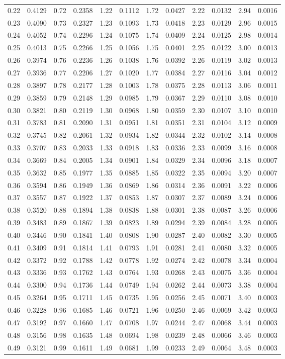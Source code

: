 \documentclass[11pt,a4paper,openany]{book}
\begin{document}
\begin{longtable}[]{@{}llllllllllll@{}}
0.22 & 0.4129 & 0.72 & 0.2358 & 1.22 & 0.1112 & 1.72 & 0.0427 & 2.22 &
0.0132 & 2.94 & 0.0016\tabularnewline
0.23 & 0.4090 & 0.73 & 0.2327 & 1.23 & 0.1093 & 1.73 & 0.0418 & 2.23 &
0.0129 & 2.96 & 0.0015\tabularnewline
0.24 & 0.4052 & 0.74 & 0.2296 & 1.24 & 0.1075 & 1.74 & 0.0409 & 2.24 &
0.0125 & 2.98 & 0.0014\tabularnewline
0.25 & 0.4013 & 0.75 & 0.2266 & 1.25 & 0.1056 & 1.75 & 0.0401 & 2.25 &
0.0122 & 3.00 & 0.0013\tabularnewline
0.26 & 0.3974 & 0.76 & 0.2236 & 1.26 & 0.1038 & 1.76 & 0.0392 & 2.26 &
0.0119 & 3.02 & 0.0013\tabularnewline
0.27 & 0.3936 & 0.77 & 0.2206 & 1.27 & 0.1020 & 1.77 & 0.0384 & 2.27 &
0.0116 & 3.04 & 0.0012\tabularnewline
0.28 & 0.3897 & 0.78 & 0.2177 & 1.28 & 0.1003 & 1.78 & 0.0375 & 2.28 &
0.0113 & 3.06 & 0.0011\tabularnewline
0.29 & 0.3859 & 0.79 & 0.2148 & 1.29 & 0.0985 & 1.79 & 0.0367 & 2.29 &
0.0110 & 3.08 & 0.0010\tabularnewline
0.30 & 0.3821 & 0.80 & 0.2119 & 1.30 & 0.0968 & 1.80 & 0.0359 & 2.30 &
0.0107 & 3.10 & 0.0010\tabularnewline
0.31 & 0.3783 & 0.81 & 0.2090 & 1.31 & 0.0951 & 1.81 & 0.0351 & 2.31 &
0.0104 & 3.12 & 0.0009\tabularnewline
0.32 & 0.3745 & 0.82 & 0.2061 & 1.32 & 0.0934 & 1.82 & 0.0344 & 2.32 &
0.0102 & 3.14 & 0.0008\tabularnewline
0.33 & 0.3707 & 0.83 & 0.2033 & 1.33 & 0.0918 & 1.83 & 0.0336 & 2.33 &
0.0099 & 3.16 & 0.0008\tabularnewline
0.34 & 0.3669 & 0.84 & 0.2005 & 1.34 & 0.0901 & 1.84 & 0.0329 & 2.34 &
0.0096 & 3.18 & 0.0007\tabularnewline
0.35 & 0.3632 & 0.85 & 0.1977 & 1.35 & 0.0885 & 1.85 & 0.0322 & 2.35 &
0.0094 & 3.20 & 0.0007\tabularnewline
0.36 & 0.3594 & 0.86 & 0.1949 & 1.36 & 0.0869 & 1.86 & 0.0314 & 2.36 &
0.0091 & 3.22 & 0.0006\tabularnewline
0.37 & 0.3557 & 0.87 & 0.1922 & 1.37 & 0.0853 & 1.87 & 0.0307 & 2.37 &
0.0089 & 3.24 & 0.0006\tabularnewline
0.38 & 0.3520 & 0.88 & 0.1894 & 1.38 & 0.0838 & 1.88 & 0.0301 & 2.38 &
0.0087 & 3.26 & 0.0006\tabularnewline
0.39 & 0.3483 & 0.89 & 0.1867 & 1.39 & 0.0823 & 1.89 & 0.0294 & 2.39 &
0.0084 & 3.28 & 0.0005\tabularnewline
0.40 & 0.3446 & 0.90 & 0.1841 & 1.40 & 0.0808 & 1.90 & 0.0287 & 2.40 &
0.0082 & 3.30 & 0.0005\tabularnewline
0.41 & 0.3409 & 0.91 & 0.1814 & 1.41 & 0.0793 & 1.91 & 0.0281 & 2.41 &
0.0080 & 3.32 & 0.0005\tabularnewline
0.42 & 0.3372 & 0.92 & 0.1788 & 1.42 & 0.0778 & 1.92 & 0.0274 & 2.42 &
0.0078 & 3.34 & 0.0004\tabularnewline
0.43 & 0.3336 & 0.93 & 0.1762 & 1.43 & 0.0764 & 1.93 & 0.0268 & 2.43 &
0.0075 & 3.36 & 0.0004\tabularnewline
0.44 & 0.3300 & 0.94 & 0.1736 & 1.44 & 0.0749 & 1.94 & 0.0262 & 2.44 &
0.0073 & 3.38 & 0.0004\tabularnewline
0.45 & 0.3264 & 0.95 & 0.1711 & 1.45 & 0.0735 & 1.95 & 0.0256 & 2.45 &
0.0071 & 3.40 & 0.0003\tabularnewline
0.46 & 0.3228 & 0.96 & 0.1685 & 1.46 & 0.0721 & 1.96 & 0.0250 & 2.46 &
0.0069 & 3.42 & 0.0003\tabularnewline
0.47 & 0.3192 & 0.97 & 0.1660 & 1.47 & 0.0708 & 1.97 & 0.0244 & 2.47 &
0.0068 & 3.44 & 0.0003\tabularnewline
0.48 & 0.3156 & 0.98 & 0.1635 & 1.48 & 0.0694 & 1.98 & 0.0239 & 2.48 &
0.0066 & 3.46 & 0.0003\tabularnewline
0.49 & 0.3121 & 0.99 & 0.1611 & 1.49 & 0.0681 & 1.99 & 0.0233 & 2.49 &
0.0064 & 3.48 & 0.0003\tabularnewline
\bottomrule
\end{longtable}
\end{document}
